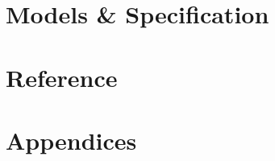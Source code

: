 \part{Models \& Specification}\label{part:models}






\part{Reference}\label{part:ref}




\part{Appendices}\label{part:app}
\appendix








\PrintGlossaries


